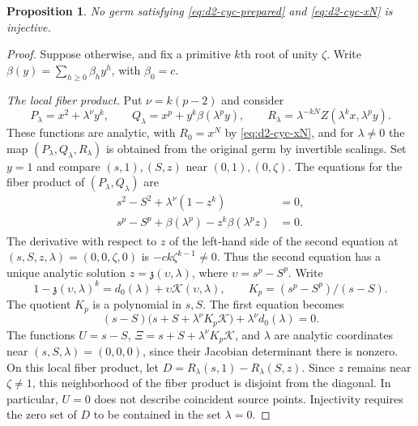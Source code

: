 \documentclass[11pt,letterpaper]{article}
\numberwithin{equation}{section}
\newtheorem{proposition}[proposition]{Proposition}
\theoremstyle{remark}
\theoremstyle{plain}
\begin{document}
\begin{proposition}\label{prop:d2-cyclic-separation}
No germ satisfying \eqref{eq:d2-cyc-prepared} and
\eqref{eq:d2-cyc-xN} is injective.
\end{proposition}

\begin{proof}
Suppose otherwise, and fix a primitive $k$th root of unity $\zeta$.
Write $\beta(y)=\sum_{h\geq0}\beta_hy^h$, with $\beta_0=c$.

\smallskip
\noindent\emph{The local fiber product.}
Put $\nu=k(p-2)$ and consider
\[
 P_\lambda=x^2+\lambda^\nu y^k,\qquad
 Q_\lambda=x^p+y^k\beta(\lambda^py),\qquad
 R_\lambda=\lambda^{-kN}Z(\lambda^kx,\lambda^py).
\]
These functions are analytic, with $R_0=x^N$ by
\eqref{eq:d2-cyc-xN}, and for
$\lambda\neq0$ the map $(P_\lambda,Q_\lambda,R_\lambda)$ is obtained
from the original germ by invertible scalings.  Set $y=1$ and compare $(s,1),(S,z)$
near $(0,1),(0,\zeta)$.  The equations for the fiber product of
$(P_\lambda,Q_\lambda)$ are
\begin{equation}
 \begin{aligned}
 s^2-S^2+\lambda^\nu(1-z^k)&=0,\\
 s^p-S^p+\beta(\lambda^p)-z^k\beta(\lambda^pz)&=0.
 \end{aligned}
 \label{eq:d2-cyc-fiber-product}
\end{equation}
The derivative with respect to $z$ of the left-hand side of the second
equation at $(s,S,z,\lambda)=(0,0,\zeta,0)$ is
$-ck\zeta^{k-1}\neq0$.  Thus the second equation has a unique analytic
solution
$z=\mathfrak z(\upsilon,\lambda)$, where $\upsilon=s^p-S^p$.
Write
\[
 1-\mathfrak z(\upsilon,\lambda)^k
 =d_0(\lambda)+\upsilon\mathcal K(\upsilon,\lambda),\qquad
 K_p=(s^p-S^p)/(s-S).
\]
The quotient $K_p$ is a polynomial in $s,S$.
The first equation becomes
\begin{equation}
 (s-S)\bigl(s+S+\lambda^\nu K_p\mathcal K\bigr)
            +\lambda^\nu d_0(\lambda)=0.             \label{eq:d2-cyc-hypersurface}
\end{equation}
The functions $U=s-S$,
$\Xi=s+S+\lambda^\nu K_p\mathcal K$, and $\lambda$ are analytic
coordinates near $(s,S,\lambda)=(0,0,0)$, since their Jacobian
determinant there is nonzero.
On this local fiber product, let $D=R_\lambda(s,1)-R_\lambda(S,z)$.
Since $z$ remains near $\zeta\neq1$, this neighborhood of the
fiber product is disjoint from the diagonal.
In particular, $U=0$ does not describe coincident source points.
Injectivity requires the zero set of $D$ to be contained in
the set $\lambda=0$.


\end{proof}
\end{document}

